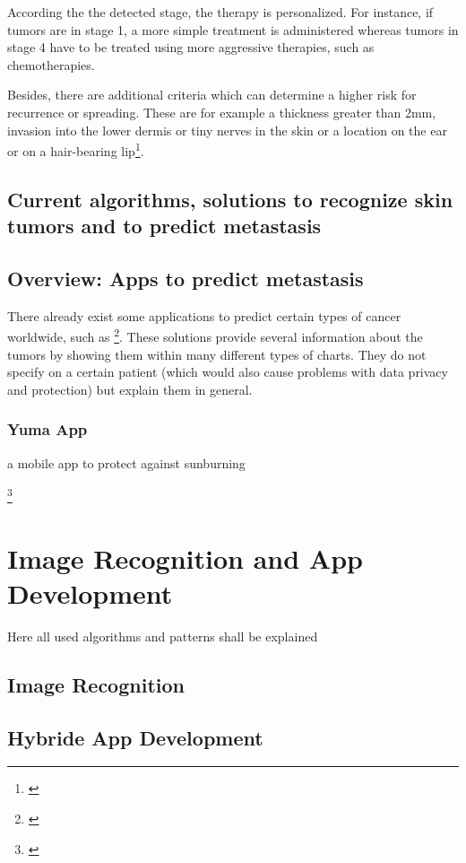According the the detected stage, the therapy is personalized. For instance, if tumors are in stage 1, a more simple treatment is administered whereas tumors in stage 4 have to be treated using more aggressive therapies, such as chemotherapies.   

Besides, there are additional criteria which can determine a higher risk for recurrence or spreading. These are for example a thickness greater than 2mm, invasion into the lower dermis or tiny nerves in the skin or a location on the ear or on a hair-bearing lip\footnote{\cite{skin_cancer_types}}.

\section{Current algorithms, solutions to recognize skin tumors and to predict metastasis}

\section{Overview: Apps to predict metastasis}

There already exist some applications to predict certain types of cancer worldwide, such as \footnote{\cite{iarc_predict_cancer_worldwide}}. These solutions provide several information about the tumors by showing them within many different types of charts. They do not specify on a certain patient (which would also cause problems with data privacy and protection) but explain them in general.  

\subsection{Yuma App}
a mobile app to protect against sunburning

\footnote{\cite{vijini_gen_alg}}


\chapter{Image Recognition and App Development}
Here all used algorithms and patterns shall be explained

\section{Image Recognition}
\section{Hybride App Development}

